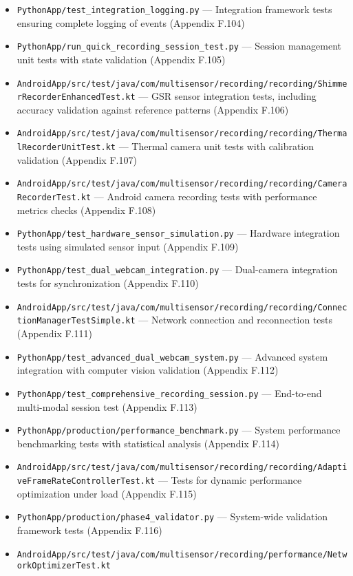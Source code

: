 {{{{{{{{{{{{{{\begin{itemize}
\item \texttt{PythonApp/test\_integration\_logging.py} --- Integration framework
tests ensuring complete logging of events (Appendix F.104)
\item \texttt{PythonApp/run\_quick\_recording\_session\_test.py} --- Session
management unit tests with state validation (Appendix F.105)
\item
\texttt{AndroidApp/src/test/java/com/multisensor/recording/recording/ShimmerRecorderEnhancedTest.kt}
--- GSR sensor integration tests, including accuracy validation against
reference patterns (Appendix F.106)
\item
\texttt{AndroidApp/src/test/java/com/multisensor/recording/recording/ThermalRecorderUnitTest.kt}
--- Thermal camera unit tests with calibration validation (Appendix F.107)
\item
\texttt{AndroidApp/src/test/java/com/multisensor/recording/recording/CameraRecorderTest.kt}
--- Android camera recording tests with performance metrics checks (Appendix
F.108)
\item \texttt{PythonApp/test\_hardware\_sensor\_simulation.py} --- Hardware
integration tests using simulated sensor input (Appendix F.109)
\item \texttt{PythonApp/test\_dual\_webcam\_integration.py} --- Dual-camera
integration tests for synchronization (Appendix F.110)
\item
\texttt{AndroidApp/src/test/java/com/multisensor/recording/recording/ConnectionManagerTestSimple.kt}
--- Network connection and reconnection tests (Appendix F.111)
\item \texttt{PythonApp/test\_advanced\_dual\_webcam\_system.py} --- Advanced
system integration with computer vision validation (Appendix F.112)
\item \texttt{PythonApp/test\_comprehensive\_recording\_session.py} ---
End-to-end multi-modal session test (Appendix F.113)
\item \texttt{PythonApp/production/performance\_benchmark.py} --- System
performance benchmarking tests with statistical analysis (Appendix F.114)
\item
\texttt{AndroidApp/src/test/java/com/multisensor/recording/recording/AdaptiveFrameRateControllerTest.kt}
--- Tests for dynamic performance optimization under load (Appendix F.115)
\item \texttt{PythonApp/production/phase4\_validator.py} --- System-wide
validation framework tests (Appendix F.116)
\item
\texttt{AndroidApp/src/test/java/com/multisensor/recording/performance/NetworkOptimizerTest.kt}

\end{itemize}}}}}}}}}}}}}}}
